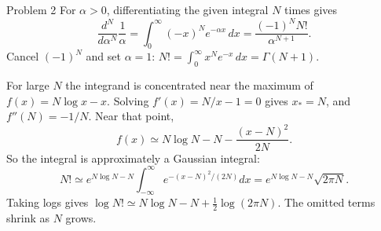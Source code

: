 \documentclass[12pt,a4paper]{article}
\begin{document}
\begin{solution}{Problem 2}
For $\alpha>0$, differentiating the given integral $N$ times gives
\[
 \frac{d^N}{d\alpha^N}\frac1\alpha
 =\int_0^\infty (-x)^N e^{-\alpha x}\,dx
 =\frac{(-1)^N N!}{\alpha^{N+1}}.
\]
Cancel $(-1)^N$ and set $\alpha=1$:
$N!=\int_0^\infty x^N e^{-x}\,dx=\Gamma(N+1)$.

For large $N$ the integrand is concentrated near the maximum of
$f(x)=N\log x-x$. Solving $f'(x)=N/x-1=0$ gives $x_*=N$, and
$f''(N)=-1/N$. Near that point,
\[
 f(x)\simeq N\log N-N-\frac{(x-N)^2}{2N}.
\]
So the integral is approximately a Gaussian integral:
\[
 N!\simeq e^{N\log N-N}
       \int_{-\infty}^{\infty}e^{-(x-N)^2/(2N)}dx
   =e^{N\log N-N}\sqrt{2\pi N}.
\]
Taking logs gives $\boxed{\log N!\simeq N\log N-N+\tfrac12\log(2\pi N)}$.
The omitted terms shrink as $N$ grows.
\end{solution}
\end{document}
